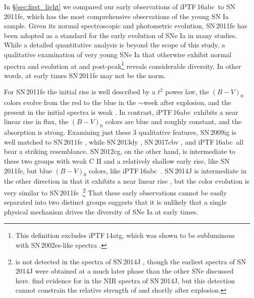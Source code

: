 \documentclass[twocolumn]{aastex61}
\newcommand{\abc}{iPTF\,16abc}
\begin{document}
In \S\ref{sec:first_light} we compared our early observations of \abc\ to SN\,2011fe, which has the most comprehensive observations of the young SN Ia sample. Given its normal spectroscopic and photometric evolution, SN\,2011fe has been adopted as a standard for the early evolution of SNe Ia in many studies. While a detailed quantitative analysis is beyond the scope of this study, a qualitative examination of very young SNe Ia that otherwise exhibit normal spectra and evolution at and post-peak\footnote{This definition excludes iPTF\,14atg, which was shown to be subluminous with SN\,2002es-like spectra \citep{2015Natur.521..328C}.} reveals considerable diversity. In other words, at early times SN\,2011fe may not be the norm.

For SN\,2011fe the initial rise is well described by a $t^2$ power law, the $(B - V)_0$ colors evolve from the red to the blue in the $\sim$week after explosion, and the  present in the initial spectra is weak \citep{2011Natur.480..344N,2016ApJ...820...67Z,2012ApJ...752L..26P}. In contrast, \abc\ exhibits a near linear rise in flux, the $(B - V)_0$ colors are blue and roughly constant, and the  absorption is strong. Examining just these 3 qualitative features, SN\,2009ig is well matched to SN\,2011fe \citep{2012ApJ...744...38F}, while SN\,2013dy \citep{2013ApJ...778L..15Z}, SN\,2017cbv \citep{2017ApJ...845L..11H}, and \abc\ all bear a striking resemblance. SN\,2012cg, on the other hand, is intermediate to these two groups with weak C II and a relatively shallow early rise, like SN\,2011fe, but blue $(B - V)_0$ colors, like \abc\ \citep{2012ApJ...756L...7S,2016ApJ...820...92M}. SN\,2014J is intermediate in the other direction in that it exhibits a near linear rise \citep{2014ApJ...783L..24Z,2015ApJ...799..106G}, but the color evolution is very similar to SN\,2011fe \citep{2014ApJ...788L..21A}.\footnote{ is not detected in the spectra of SN\,2014J \citep{2014ApJ...784L..12G,2014ApJ...783L..24Z}, though the earliest spectra of SN\,2014J were obtained at a much later phase than the other SNe discussed here. \citet{2015ApJ...798...39M} find evidence for  in the NIR spectra of SN\,2014J, but this detection cannot constrain the relative strength of  and  shortly after explosion.} That these early observations cannot be easily separated into two distinct groups suggests that it is unlikely that a single physical mechanism drives the diversity of SNe Ia at early times. 
\end{document}
